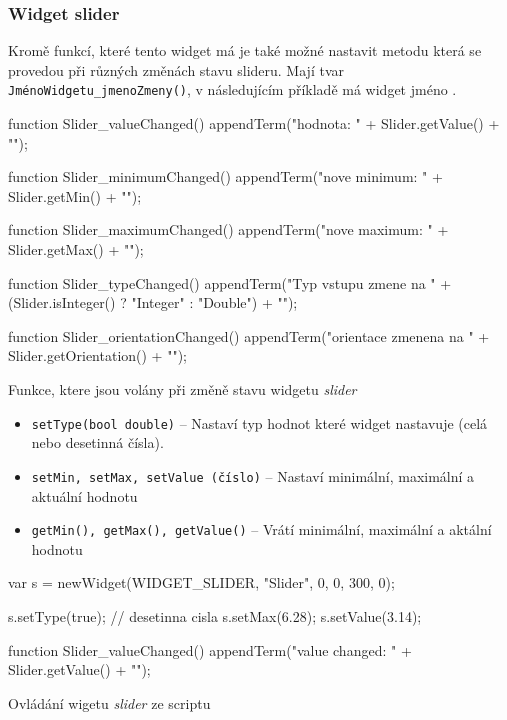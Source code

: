 \documentclass[12pt, a4paper, oneside]{article}
\newcommand{\It}{\textit}  %
\begin{document}
\subsubsection*{Widget slider}
Kromě funkcí, které tento widget má je také možné nastavit metodu která se provedou při různých změnách stavu slideru. Mají tvar  {\color{blue}\verb/JménoWidgetu_jmenoZmeny()/}, v následujícím příkladě má widget jméno .
\begin{listing}[H]
\begin{jscode}
function Slider_valueChanged() {
    appendTerm("hodnota: " + Slider.getValue() + "\n");
}

function Slider_minimumChanged() {
    appendTerm("nove minimum: " + Slider.getMin() + "\n");
}

function Slider_maximumChanged() {
    appendTerm("nove maximum: " + Slider.getMax() + "\n");
}

function Slider_typeChanged() {
    appendTerm("Typ vstupu zmene na " +
        (Slider.isInteger() ? "Integer" : "Double") + "\n");
}

function Slider_orientationChanged() {
    appendTerm("orientace zmenena na " +
        Slider.getOrientation() + "\n");
}
\end{jscode}
\caption{Funkce, ktere jsou volány při změně stavu widgetu \It{slider}}
\end{listing}
\begin{itemize}
    \item {\color{blue}\verb/setType(bool double)/} -- Nastaví typ hodnot které widget nastavuje (celá nebo desetinná čísla).
    \item {\color{blue}\verb/setMin, setMax, setValue (číslo)/} -- Nastaví minimální, maximální a aktuální hodnotu
    \item {\color{blue}\verb/getMin(), getMax(), getValue()/} -- Vrátí minimální, maximální a aktální hodnotu
\end{itemize}

\begin{listing}[H]
\begin{jscode}
var s = newWidget(WIDGET_SLIDER, "Slider", 0, 0, 300, 0);

s.setType(true); // desetinna cisla
s.setMax(6.28);
s.setValue(3.14);

function Slider_valueChanged() {
    appendTerm("value changed: " + Slider.getValue() + "\n");
}
\end{jscode}
\caption{Ovládání wigetu \It{slider} ze scriptu}
\end{listing}
\end{document}
